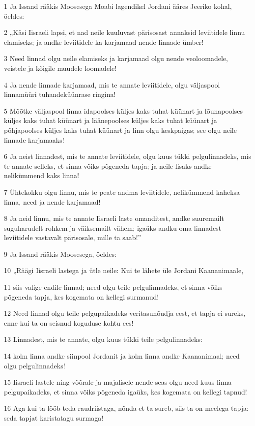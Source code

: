 \par 1 Ja Issand rääkis Moosesega Moabi lagendikel Jordani ääres Jeeriko kohal, öeldes:
\par 2 „Käsi Iisraeli lapsi, et nad neile kuuluvast pärisosast annaksid leviitidele linnu elamiseks; ja andke leviitidele ka karjamaad nende linnade ümber!
\par 3 Need linnad olgu neile elamiseks ja karjamaad olgu nende veoloomadele, veistele ja kõigile muudele loomadele!
\par 4 Ja nende linnade karjamaad, mis te annate leviitidele, olgu väljaspool linnamüüri tuhandeküünrase ringina!
\par 5 Mõõtke väljaspool linna idapoolses küljes kaks tuhat küünart ja lõunapoolses küljes kaks tuhat küünart ja läänepoolses küljes kaks tuhat küünart ja põhjapoolses küljes kaks tuhat küünart ja linn olgu keskpaigas; see olgu neile linnade karjamaaks!
\par 6 Ja neist linnadest, mis te annate leviitidele, olgu kuus tükki pelgulinnadeks, mis te annate selleks, et sinna võiks põgeneda tapja; ja neile lisaks andke nelikümmend kaks linna!
\par 7 Ühtekokku olgu linnu, mis te peate andma leviitidele, nelikümmend kaheksa linna, need ja nende karjamaad!
\par 8 Ja neid linnu, mis te annate Iisraeli laste omanditest, andke suuremailt suguharudelt rohkem ja väiksemailt vähem; igaüks andku oma linnadest leviitidele vastavalt pärisosale, mille ta saab!”
\par 9 Ja Issand rääkis Moosesega, öeldes:
\par 10 „Räägi Iisraeli lastega ja ütle neile: Kui te lähete üle Jordani Kaananimaale,
\par 11 siis valige endile linnad; need olgu teile pelgulinnadeks, et sinna võiks põgeneda tapja, kes kogemata on kellegi surmanud!
\par 12 Need linnad olgu teile pelgupaikadeks veritasunõudja eest, et tapja ei sureks, enne kui ta on seisnud koguduse kohtu ees!
\par 13 Linnadest, mis te annate, olgu kuus tükki teile pelgulinnadeks:
\par 14 kolm linna andke siinpool Jordanit ja kolm linna andke Kaananimaal; need olgu pelgulinnadeks!
\par 15 Iisraeli lastele ning võõrale ja majalisele nende seas olgu need kuus linna pelgupaikadeks, et sinna võiks põgeneda igaüks, kes kogemata on kellegi tapnud!
\par 16 Aga kui ta lööb teda raudriistaga, nõnda et ta sureb, siis ta on meelega tapja: seda tapjat karistatagu surmaga!
